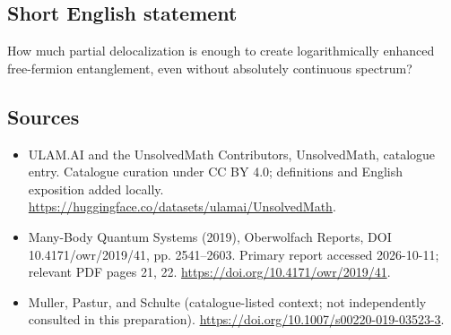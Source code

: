 \documentclass[11pt]{article}
\begin{document}
\subsection{Short English statement}
How much partial delocalization is enough to create logarithmically enhanced free-fermion entanglement, even without absolutely continuous spectrum?
\subsection{Sources}
\begin{itemize}
\item[\hypertarget{source:statement:1}{S1}] ULAM.AI and the UnsolvedMath Contributors, UnsolvedMath, catalogue entry. Catalogue curation under CC BY 4.0; definitions and English exposition added locally.
\url{https://huggingface.co/datasets/ulamai/UnsolvedMath}.
\item[\hypertarget{source:statement:2}{S2}] Many-Body Quantum Systems (2019), Oberwolfach Reports, DOI 10.4171/owr/2019/41, pp. 2541--2603. Primary report accessed 2026-10-11; relevant PDF pages 21, 22.
\url{https://doi.org/10.4171/owr/2019/41}.
\item[\hypertarget{source:statement:3}{S3}] Muller, Pastur, and Schulte (catalogue-listed context; not independently consulted in this preparation).
\url{https://doi.org/10.1007/s00220-019-03523-3}.
\end{itemize}
\label{end:statement}
\end{document}
